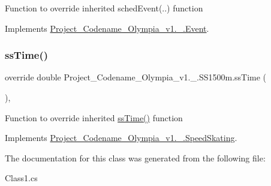 Function to override inherited sched\+Event(..) function 

Implements \hyperlink{classProject__Codename__Olympia__v1_1_1__0_1_1Event_abb4e2b9c28527b9a28395f2fe9192196}{Project\+\_\+\+Codename\+\_\+\+Olympia\+\_\+v1.\+\_.\+Event}.

\mbox{\label{classProject__Codename__Olympia__v1_1_1__0_1_1SS1500m_a70484e4f6b73c271756fa9bb6950eb0b}} 
\subsubsection{\texorpdfstring{ss\+Time()}{ssTime()}}
{\footnotesize\ttfamily override double Project\+\_\+\+Codename\+\_\+\+Olympia\+\_\+v1.\+\_.\+S\+S1500m.\+ss\+Time (\begin{DoxyParamCaption}{ }\end{DoxyParamCaption})\hspace{0.3cm}{\ttfamily [inline]}, {\ttfamily [virtual]}}

Function to override inherited \hyperlink{classProject__Codename__Olympia__v1_1_1__0_1_1SS1500m_a70484e4f6b73c271756fa9bb6950eb0b}{ss\+Time()} function 

Implements \hyperlink{classProject__Codename__Olympia__v1_1_1__0_1_1SpeedSkating_acedc7b2f1bfab95ee054531364ea50fb}{Project\+\_\+\+Codename\+\_\+\+Olympia\+\_\+v1.\+\_.\+Speed\+Skating}.



The documentation for this class was generated from the following file\+:\begin{DoxyCompactItemize}
\item 
Class1.\+cs\end{DoxyCompactItemize}
